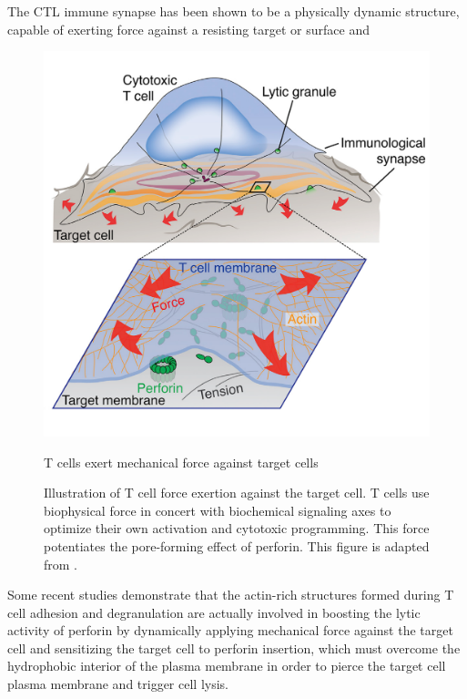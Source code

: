 The CTL immune synapse has been shown to be a physically dynamic structure, capable of exerting force against a resisting target or surface and 

\begin{figure}[htbp]
	\centering
	\includegraphics[width=\textwidth]{../figures/chapter1/mechforce.png}
	\caption{T cells exert mechanical force against target cells}
	\caption*{Illustration of T cell force exertion against the target cell. T cells use biophysical force in concert with biochemical signaling axes to optimize their own activation and cytotoxic programming.  This force potentiates the pore-forming effect of perforin. This figure is adapted from \cite{Rak2011}.}
	\label{fig:mechforce}
\end{figure}

Some recent studies demonstrate that the actin-rich structures formed during T cell adhesion and degranulation are actually involved in boosting the lytic activity of perforin by dynamically applying mechanical force against the target cell \cite{Basu2016, Tamzalit2018} and sensitizing the target cell to perforin insertion, which must overcome the hydrophobic interior of the plasma membrane in order to pierce the target cell plasma membrane and trigger cell lysis.

